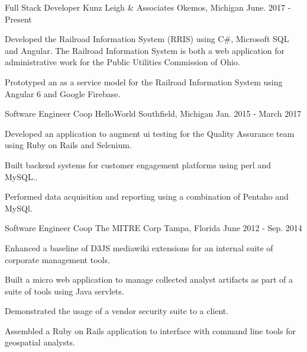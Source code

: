 
\begin{cventries}

  \cventry
    {Full Stack Developer} %
    {Kunz Leigh \& Associates} %
    {Okemos, Michigan} %
    {June. 2017 - Present} %
    {
      \begin{cvitems} %
      \item {Developed the Railroad Information System (RRIS) using C\#, Microsoft SQL and Angular. The Railroad Information System is both a web application for administrative work for the Public Utilities Commission of Ohio.}
      \item {Prototyped an as a service model for the Railroad Information System using Angular 6 and Google Firebase.}
      \end{cvitems}
    }

\cventry
  {Software Engineer Coop} %
  {HelloWorld} %
  {Southfield, Michigan} %
  {Jan. 2015 - March 2017} %
  {
    \begin{cvitems} %
    \item {Developed an application to augment ui testing for the Quality Assurance team using Ruby on Rails and Selenium.}
    \item {Built backend systems for customer engagement platforms using perl and MySQL..}
    \item {Performed data acquisition and reporting using a combination of Pentaho and MySQl.}
    \end{cvitems}
  }

\cventry
  {Software Engineer Coop} %
  {The MITRE Corp} %
  {Tampa, Florida} %
  {June 2012 - Sep. 2014} %
  {
    \begin{cvitems} %
      \item {Enhanced a baseline of D3JS mediawiki extensions for an internal suite of corporate management tools.}
      \item {Built a micro web application to manage collected analyst artifacts as part of a suite of tools using Java servlets.}
      \item {Demonstrated the usage of a vendor security suite to a client.}
      \item {Assembled a Ruby on Rails application to interface with command line tools for geospatial analysts.}
    \end{cvitems}
  }

\end{cventries}
